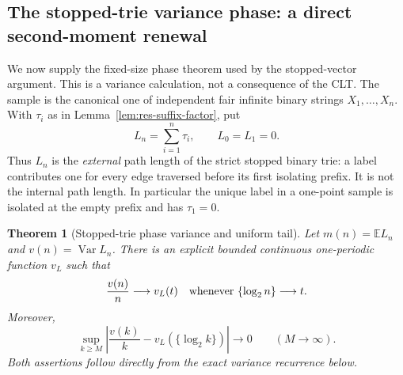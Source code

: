 \documentclass[11pt]{article}
\numberwithin{equation}{section}
\newtheorem{theorem}{Theorem}[section]
\newcommand{\1}{\mathbf 1}\newcommand{\F}{\mathcal F}\newcommand{\D}{\mathcal D}
\begin{document}
\subsection{The stopped-trie variance phase: a direct second-moment renewal}
\label{subsec:stopped-trie-phase}

We now supply the fixed-size phase theorem used by the stopped-vector
argument.  This is a variance calculation, not a consequence of the CLT.
The sample is the canonical one of independent fair infinite binary strings
$X_1,\ldots,X_n$.  With $\tau_i$ as in
Lemma~\ref{lem:res-suffix-factor}, put
\begin{equation}
 L_n=\sum_{i=1}^n\tau_i,\qquad L_0=L_1=0.       \label{eq:trie-L-definition}
\end{equation}
Thus $L_n$ is the \emph{external} path length of the strict stopped binary
trie: a label contributes one for every edge traversed before its first
isolating prefix.  It is not the internal path length.  In particular the
unique label in a one-point sample is isolated at the empty prefix and has
$\tau_1=0$.

\begin{theorem}[Stopped-trie phase variance and uniform tail]
\label{thm:stopped-trie-phase}
Let $m(n)=\mathbb EL_n$ and $v(n)=\operatorname {Var}L_n$.  There is an
explicit bounded continuous one-periodic function $v_L$ such that
\begin{equation}
 \frac{v(n)}n\longrightarrow v_L(t)
 \quad\hbox{whenever }\{\log _2n\}\longrightarrow t.       \label{eq:trie-phase-limit}
\end{equation}
Moreover,
\begin{equation}
 \sup_{k\ge M}\left|\frac{v(k)}k-v_L(\{\log _2k\})\right|
 \longrightarrow0\qquad(M\to\infty).                       \label{eq:trie-uniform-tail}
\end{equation}
Both assertions follow directly from the exact variance recurrence below.
\end{theorem}
\end{document}
